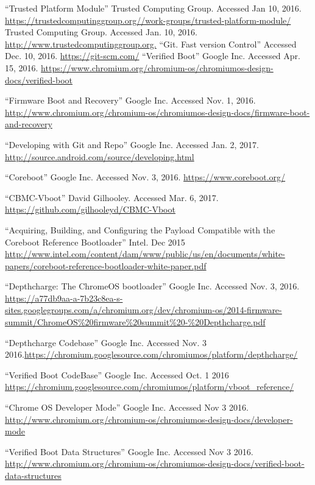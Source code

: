 \documentclass[12pt,lot, lof]{puthesis}
\begin{document}
\begin{flushleft}
\begin{footnotesize}
\begin{thebibliography}{\kern\bibindent}
        ``Trusted Platform Module'' Trusted Computing Group. Accessed Jan 10, 2016. \url{https://trustedcomputinggroup.org//work-groups/trusted-platform-module/}
        Trusted Computing Group. Accessed Jan. 10, 2016. \url{http://www.trustedcomputinggroup.org.}
        ``Git. Fast version Control'' Accessed Dec. 10, 2016. \url{https://git-scm.com/}
        ``Verified Boot'' Google Inc. Accessed Apr. 15, 2016. \url{https://www.chromium.org/chromium-os/chromiumos-design-docs/verified-boot}

    ``Firmware Boot and Recovery'' Google Inc. Accessed Nov. 1, 2016. \url{http://www.chromium.org/chromium-os/chromiumos-design-docs/firmware-boot-and-recovery}

    ``Developing with Git and Repo'' Google Inc. Accessed Jan. 2, 2017. \url{http://source.android.com/source/developing.html}

    ``Coreboot'' Google Inc. Accessed Nov. 3, 2016. \url{https://www.coreboot.org/}

    ``CBMC-Vboot'' David Gilhooley. Accessed Mar. 6, 2017. \url{https://github.com/gilhooleyd/CBMC-Vboot}

    ``Acquiring, Building, and Configuring the Payload Compatible with the Coreboot Reference Bootloader'' Intel. Dec 2015 \url{http://www.intel.com/content/dam/www/public/us/en/documents/white-papers/coreboot-reference-bootloader-white-paper.pdf}

    ``Depthcharge: The ChromeOS bootloader'' Google Inc. Accessed Nov. 3, 2016.
    \url{https://a77db9aa-a-7b23c8ea-s-sites.googlegroups.com/a/chromium.org/dev/chromium-os/2014-firmware-summit/ChromeOS\%20firmware\%20summit\%20-\%20Depthcharge.pdf}

    ``Depthcharge Codebase'' Google Inc. Accessed Nov. 3 2016.\url{https://chromium.googlesource.com/chromiumos/platform/depthcharge/}

    ``Verified Boot CodeBase'' Google Inc. Accessed Oct. 1 2016 \url{https://chromium.googlesource.com/chromiumos/platform/vboot\_reference/}

    ``Chrome OS Developer Mode'' Google Inc. Accessed Nov 3 2016. \url{http://www.chromium.org/chromium-os/chromiumos-design-docs/developer-mode}

    ``Verified Boot Data Structures'' Google Inc. Accessed Nov 3 2016. \url{http://www.chromium.org/chromium-os/chromiumos-design-docs/verified-boot-data-structures}


\end{thebibliography}
\end{footnotesize}
\end{flushleft}
\end{document}
